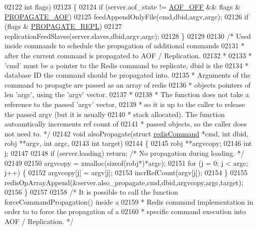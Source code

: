 \begin{DoxyCode}
{{{{{{{{{{{{{{{{{{{{{{{{{{{{{02122                \textcolor{keywordtype}{int} flags)
02123 \{
02124     \textcolor{keywordflow}{if} (server.aof\_state != \hyperlink{server_8h_a5226306fbcebcb6d5d02e0fef3c213c2}{AOF\_OFF} && flags & \hyperlink{server_8h_a542fb79924ca427c866fd63632f60777}{PROPAGATE\_AOF})
02125         feedAppendOnlyFile(cmd,dbid,argv,argc);
02126     \textcolor{keywordflow}{if} (flags & \hyperlink{server_8h_a59c6e025b4ed85642a0472fc3e73e298}{PROPAGATE\_REPL})
02127         replicationFeedSlaves(server.slaves,dbid,argv,argc);
02128 \}
02129 
02130 \textcolor{comment}{/* Used inside commands to schedule the propagation of additional commands}
02131 \textcolor{comment}{ * after the current command is propagated to AOF / Replication.}
02132 \textcolor{comment}{ *}
02133 \textcolor{comment}{ * 'cmd' must be a pointer to the Redis command to replicate, dbid is the}
02134 \textcolor{comment}{ * database ID the command should be propagated into.}
02135 \textcolor{comment}{ * Arguments of the command to propagte are passed as an array of redis}
02136 \textcolor{comment}{ * objects pointers of len 'argc', using the 'argv' vector.}
02137 \textcolor{comment}{ *}
02138 \textcolor{comment}{ * The function does not take a reference to the passed 'argv' vector,}
02139 \textcolor{comment}{ * so it is up to the caller to release the passed argv (but it is usually}
02140 \textcolor{comment}{ * stack allocated).  The function autoamtically increments ref count of}
02141 \textcolor{comment}{ * passed objects, so the caller does not need to. */}
02142 \textcolor{keywordtype}{void} alsoPropagate(\textcolor{keyword}{struct} \hyperlink{structredisCommand}{redisCommand} *cmd, \textcolor{keywordtype}{int} dbid, robj **argv, \textcolor{keywordtype}{int} argc,
02143                    \textcolor{keywordtype}{int} target)
02144 \{
02145     robj **argvcopy;
02146     \textcolor{keywordtype}{int} j;
02147 
02148     \textcolor{keywordflow}{if} (server.loading) \textcolor{keywordflow}{return}; \textcolor{comment}{/* No propagation during loading. */}
02149 
02150     argvcopy = zmalloc(\textcolor{keyword}{sizeof}(robj*)*argc);
02151     \textcolor{keywordflow}{for} (j = 0; j < argc; j++) \{
02152         argvcopy[j] = argv[j];
02153         incrRefCount(argv[j]);
02154     \}
02155     redisOpArrayAppend(&server.also\_propagate,cmd,dbid,argvcopy,argc,target);
02156 \}
02157 
02158 \textcolor{comment}{/* It is possible to call the function forceCommandPropagation() inside a}
02159 \textcolor{comment}{ * Redis command implementation in order to to force the propagation of a}
02160 \textcolor{comment}{ * specific command execution into AOF / Replication. */}
}}}}}}}}}}}}}}}}}}}}}}}}}}}}}
\end{DoxyCode}
